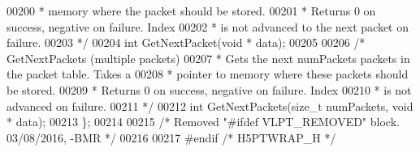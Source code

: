 \begin{DoxyCode}
00200 \textcolor{comment}{     * memory where the packet should be stored.}
00201 \textcolor{comment}{     * Returns 0 on success, negative on failure.  Index}
00202 \textcolor{comment}{     * is not advanced to the next packet on failure.}
00203 \textcolor{comment}{     */}
00204     \textcolor{keywordtype}{int} GetNextPacket(\textcolor{keywordtype}{void} * data);
00205 
00206     \textcolor{comment}{/* GetNextPackets (multiple packets)}
00207 \textcolor{comment}{     * Gets the next numPackets packets in the packet table.  Takes a}
00208 \textcolor{comment}{     * pointer to memory where these packets should be stored.}
00209 \textcolor{comment}{     * Returns 0 on success, negative on failure.  Index}
00210 \textcolor{comment}{     * is not advanced on failure.}
00211 \textcolor{comment}{     */}
00212     \textcolor{keywordtype}{int} GetNextPackets(\textcolor{keywordtype}{size\_t} numPackets, \textcolor{keywordtype}{void} * data);
00213 \};
00214 
00215 \textcolor{comment}{/* Removed "#ifdef VLPT\_REMOVED" block.  03/08/2016, -BMR */}
00216 
00217 \textcolor{preprocessor}{#endif }\textcolor{comment}{/* H5PTWRAP\_H */}\textcolor{preprocessor}{}
\end{DoxyCode}
